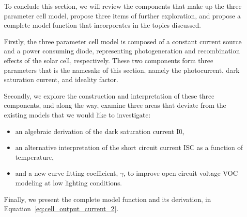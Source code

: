 To conclude this section, we will review the components that make up the three
parameter cell model, propose three items of further exploration, and propose a
complete model function that incorporates in the topics discussed.

Firstly, the three parameter cell model is composed of a constant current source
and a power consuming diode, representing photogeneration and recombination
effects of the solar cell, respectively. These two components form three
parameters that is the namesake of this section, namely the photocurrent, dark
saturation current, and ideality factor.

Secondly, we explore the construction and interpretation of these three
components, and along the way, examine three areas that deviate from the
existing models that we would like to investigate:

\begin{itemize}
    \item an algebraic derivation of the dark saturation current \ac{I0},
    \item an alternative interpretation of the short circuit current \ac{ISC} as
    a function of temperature,
    \item and a new curve fitting coefficient, $\gamma$, to improve open circuit
    voltage \ac{VOC} modeling at low lighting conditions.
\end{itemize}

Finally, we present the complete model function and its derivation, in
Equation~\ref{eq:cell_output_current_2}.

